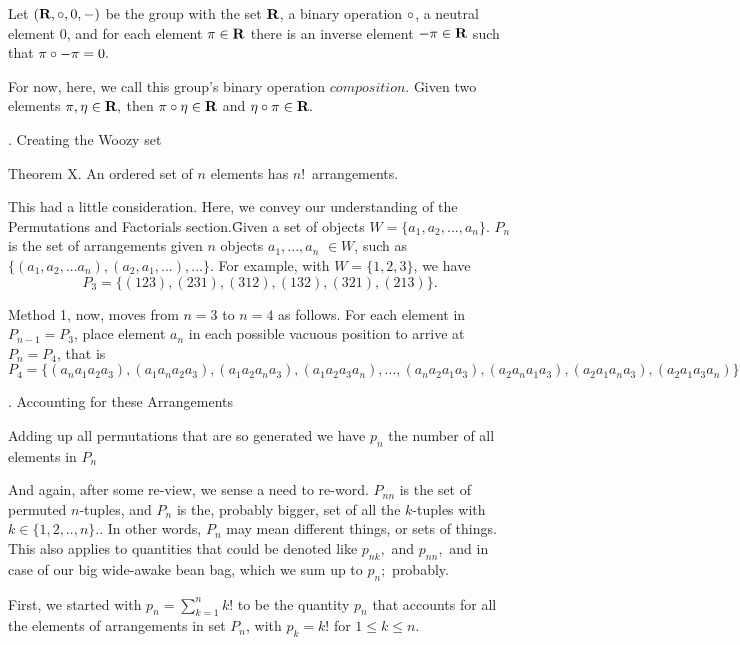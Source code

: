 \e
Let $(\hbox{\bf R},\circ,0,-)$ be the group with the set $\hbox{\bf R}$, a binary
operation $\circ$, a neutral element $0$, and
for each element $\pi\in\hbox{\bf R}$ there is an inverse element
$-\pi\in\hbox{\bf R}$ such that $\pi\circ-\pi=0.$

\e
For now, here, we call this group's binary operation $composition$.
Given two elements
$\pi,\eta\in\hbox{\bf R},$ then
$\pi\circ\eta\in\hbox{\bf R}$ and $\eta\circ\pi\in\hbox{\bf R}.$


\eject

. Creating the Woozy set

\proclaim Theorem X. An ordered set of $n$ elements
has $n!$~arrangements.

This had a little consideration.  Here, we
convey our understanding of the Permutations and
Factorials section.\f

Given a set of objects $W=\{a_1,a_2,...,a_n\}$.
$P_n$ is the set of arrangements given $n$ objects
$a_1,...,a_n$ $\in W$, such as
$\{(a_1,a_2,...a_n),(a_2,a_1,...),...\}$. For example,
with $W=\{1,2,3\}$, we have
$$P_3=\{(123),(231),(312),(132),(321),(213)\}.$$

\e
Method 1, now, moves from $n=3$ to $n=4$ as follows.
For each element in $P_{n-1}=P_3$, place element
$a_n$ in each possible vacuous position to arrive at
$P_n=P_4$, that is
$$P_4=\{(a_na_1a_2a_3),
       (a_1a_na_2a_3),
       (a_1a_2a_na_3),
       (a_1a_2a_3a_n),
       ...,
       (a_na_2a_1a_3),
       (a_2a_na_1a_3),
       (a_2a_1a_na_3),
       (a_2a_1a_3a_n)\}$$

. Accounting for these Arrangements

\e
Adding up all permutations that are so generated we have
$p_n$ the number of all elements in $P_n$ %

\e
And again, after some re-view, we sense a need to re-word.
$P_{nn}$ is the set of permuted $n$-tuples, and $P_n$ is
the, probably bigger, set of all the $k$-tuples with
$k\in\{1,2,..,n\}.$. In other words, $P_n$
may mean different things, or sets of things. This also
applies to quantities that could be denoted like $p_{nk},$
and $p_{nn},$ and in case of our big wide-awake bean bag,
which we sum up to $p_n;$  probably.

\e
First, we started with $p_n=\sum_{k=1}^n k!$
to be the quantity
$p_n$ that accounts for all the elements of
arrangements in set $P_n$, 
with $p_k=k!$ for $1\le k\le n$.

